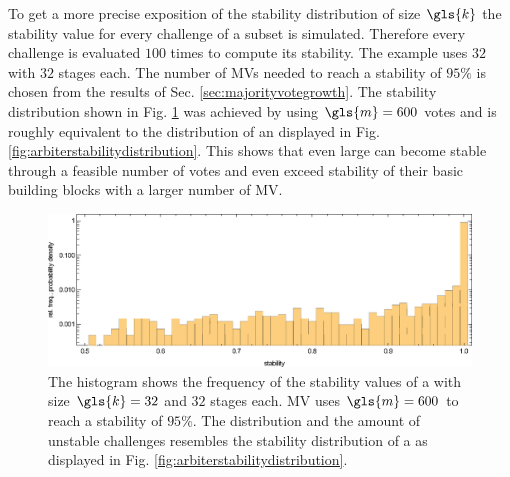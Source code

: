 To get a more precise exposition of the stability distribution of \mxpufs size $\gls{k}$ the stability value for every challenge of a subset is simulated.
Therefore every challenge is evaluated $100$ times to compute its stability.
The example uses $32$ \mpufs with $32$ stages each.
The number of \acp{MV} needed to reach a stability of $95 \%$ is chosen from the results of Sec. \ref{sec:majorityvotegrowth}.
The stability distribution shown in Fig. \ref{fig:stabilitydistributionmajorityvote} was achieved by using $\gls{m} = 600$ votes
and is roughly equivalent to the distribution of an \apuf displayed in Fig. \ref{fig:arbiterstabilitydistribution}.
This shows that even large \mxpufs can become stable through a feasible number of votes and even exceed stability of their basic building blocks with a larger number of \ac{MV}.

\begin{figure}[ht]
\includegraphics[width=1.00\textwidth]{images/majority-xor-stability-distribution-simulation.eps}
\caption{The histogram shows the frequency of the stability values of a \mxpuf with size $\gls{k} = 32$ and $32$ stages each. \ac{MV} uses $\gls{m} = 600$ to reach a stability of $95 \%$. The distribution and the amount of unstable challenges resembles the stability distribution of a \apuf as displayed in Fig. \ref{fig:arbiterstabilitydistribution}.} 
\label{fig:stabilitydistributionmajorityvote}
\end{figure}













